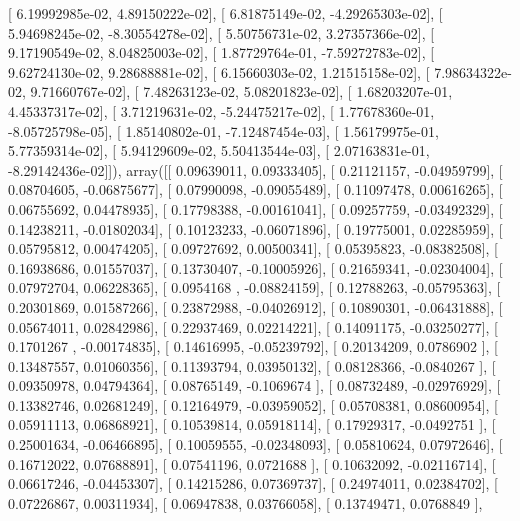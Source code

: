 \documentclass{article}
\begin{document}
       [  6.19992985e-02,   4.89150222e-02],
       [  6.81875149e-02,  -4.29265303e-02],
       [  5.94698245e-02,  -8.30554278e-02],
       [  5.50756731e-02,   3.27357366e-02],
       [  9.17190549e-02,   8.04825003e-02],
       [  1.87729764e-01,  -7.59272783e-02],
       [  9.62724130e-02,   9.28688881e-02],
       [  6.15660303e-02,   1.21515158e-02],
       [  7.98634322e-02,   9.71660767e-02],
       [  7.48263123e-02,   5.08201823e-02],
       [  1.68203207e-01,   4.45337317e-02],
       [  3.71219631e-02,  -5.24475217e-02],
       [  1.77678360e-01,  -8.05725798e-05],
       [  1.85140802e-01,  -7.12487454e-03],
       [  1.56179975e-01,   5.77359314e-02],
       [  5.94129609e-02,   5.50413544e-03],
       [  2.07163831e-01,  -8.29142436e-02]]), array([[ 0.09639011,  0.09333405],
       [ 0.21121157, -0.04959799],
       [ 0.08704605, -0.06875677],
       [ 0.07990098, -0.09055489],
       [ 0.11097478,  0.00616265],
       [ 0.06755692,  0.04478935],
       [ 0.17798388, -0.00161041],
       [ 0.09257759, -0.03492329],
       [ 0.14238211, -0.01802034],
       [ 0.10123233, -0.06071896],
       [ 0.19775001,  0.02285959],
       [ 0.05795812,  0.00474205],
       [ 0.09727692,  0.00500341],
       [ 0.05395823, -0.08382508],
       [ 0.16938686,  0.01557037],
       [ 0.13730407, -0.10005926],
       [ 0.21659341, -0.02304004],
       [ 0.07972704,  0.06228365],
       [ 0.0954168 , -0.08824159],
       [ 0.12788263, -0.05795363],
       [ 0.20301869,  0.01587266],
       [ 0.23872988, -0.04026912],
       [ 0.10890301, -0.06431888],
       [ 0.05674011,  0.02842986],
       [ 0.22937469,  0.02214221],
       [ 0.14091175, -0.03250277],
       [ 0.1701267 , -0.00174835],
       [ 0.14616995, -0.05239792],
       [ 0.20134209,  0.0786902 ],
       [ 0.13487557,  0.01060356],
       [ 0.11393794,  0.03950132],
       [ 0.08128366, -0.0840267 ],
       [ 0.09350978,  0.04794364],
       [ 0.08765149, -0.1069674 ],
       [ 0.08732489, -0.02976929],
       [ 0.13382746,  0.02681249],
       [ 0.12164979, -0.03959052],
       [ 0.05708381,  0.08600954],
       [ 0.05911113,  0.06868921],
       [ 0.10539814,  0.05918114],
       [ 0.17929317, -0.0492751 ],
       [ 0.25001634, -0.06466895],
       [ 0.10059555, -0.02348093],
       [ 0.05810624,  0.07972646],
       [ 0.16712022,  0.07688891],
       [ 0.07541196,  0.0721688 ],
       [ 0.10632092, -0.02116714],
       [ 0.06617246, -0.04453307],
       [ 0.14215286,  0.07369737],
       [ 0.24974011,  0.02384702],
       [ 0.07226867,  0.00311934],
       [ 0.06947838,  0.03766058],
       [ 0.13749471,  0.0768849 ],
\end{document}
